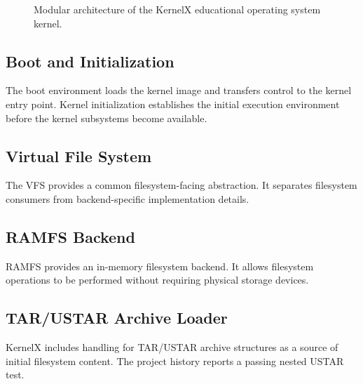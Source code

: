 \documentclass[conference]{IEEEtran}
\begin{document}
\begin{figure}[!t]

\caption{Modular architecture of the KernelX educational operating system kernel.}
\label{fig:architecture}

\end{figure}

\subsection{Boot and Initialization}

The boot environment loads the kernel image and transfers
control to the kernel entry point. Kernel initialization
establishes the initial execution environment before the
kernel subsystems become available.

\subsection{Virtual File System}

The VFS provides a common filesystem-facing abstraction.
It separates filesystem consumers from backend-specific
implementation details.

\subsection{RAMFS Backend}

RAMFS provides an in-memory filesystem backend. It allows
filesystem operations to be performed without requiring
physical storage devices.

\subsection{TAR/USTAR Archive Loader}

KernelX includes handling for TAR/USTAR archive structures
as a source of initial filesystem content. The project
history reports a passing nested USTAR test.
\end{document}
